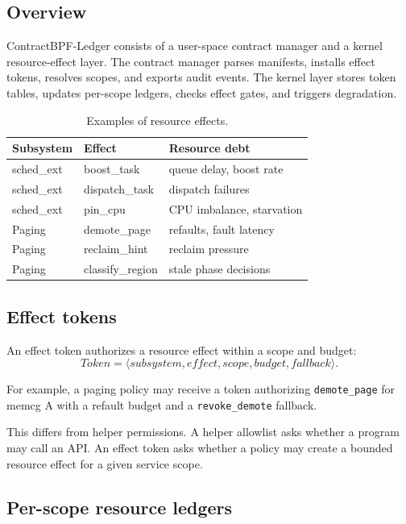 \documentclass[letterpaper,twocolumn,10pt]{article}
\newcommand{\sys}{ContractBPF-Ledger\xspace}
\begin{document}
\subsection{Overview}

\sys consists of a user-space contract manager and a kernel resource-effect layer. The contract manager parses manifests, installs effect tokens, resolves scopes, and exports audit events. The kernel layer stores token tables, updates per-scope ledgers, checks effect gates, and triggers degradation.

\begin{table}[t]
\centering
\caption{Examples of resource effects.}
\begin{tabular}{lll}
\toprule
Subsystem & Effect & Resource debt \\
\midrule
sched\_ext & boost\_task & queue delay, boost rate \\
sched\_ext & dispatch\_task & dispatch failures \\
sched\_ext & pin\_cpu & CPU imbalance, starvation \\
Paging & demote\_page & refaults, fault latency \\
Paging & reclaim\_hint & reclaim pressure \\
Paging & classify\_region & stale phase decisions \\
\bottomrule
\end{tabular}
\end{table}

\subsection{Effect tokens}

An effect token authorizes a resource effect within a scope and budget:
\[
Token = \langle subsystem, effect, scope, budget, fallback \rangle.
\]

For example, a paging policy may receive a token authorizing
\texttt{demote\_page} for memcg A with a refault budget and a
\texttt{revoke\_demote} fallback.

This differs from helper permissions. A helper allowlist asks whether a program may call an API. An effect token asks whether a policy may create a bounded resource effect for a given service scope.

\subsection{Per-scope resource ledgers}
\end{document}
